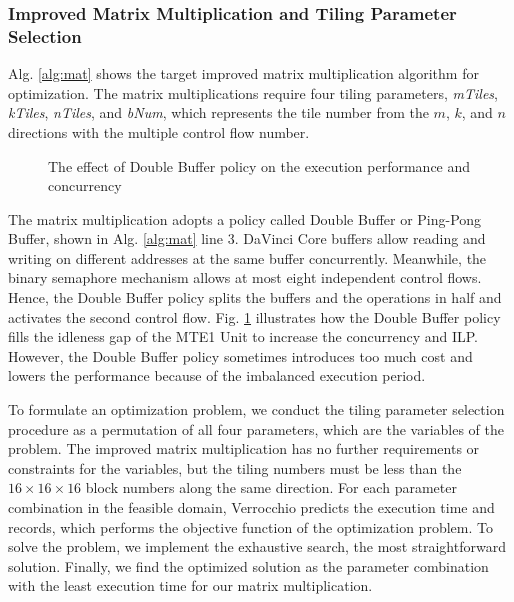 \documentclass[12pt]{extbook}
\begin{document}
\subsubsection{Improved Matrix Multiplication and Tiling Parameter Selection}

Alg. \ref{alg:mat} shows the target improved matrix multiplication algorithm for optimization. The matrix multiplications require four tiling parameters, \textit{mTiles}, \textit{kTiles}, \textit{nTiles}, and \textit{bNum}, which represents the tile number from the $m$, $k$, and $n$ directions with the multiple control flow number. 

\begin{figure}[tbp]
    \captionsetup{justification=centering}
    \caption{The effect of Double Buffer policy on the execution performance and concurrency}
    \label{fig:doubleb}
    \end{figure}

The matrix multiplication adopts a policy called Double Buffer or Ping-Pong Buffer, shown in Alg. \ref{alg:mat} line 3. DaVinci Core buffers allow reading and writing on different addresses at the same buffer concurrently. Meanwhile, the binary semaphore mechanism allows at most eight independent control flows. Hence, the Double Buffer policy splits the buffers and the operations in half and activates the second control flow. Fig. \ref{fig:doubleb} illustrates how the Double Buffer policy fills the idleness gap of the MTE1 Unit to increase the concurrency and ILP. However, the Double Buffer policy sometimes introduces too much cost and lowers the performance because of the imbalanced execution period.

To formulate an optimization problem, we conduct the tiling parameter selection procedure as a permutation of all four parameters, which are the variables of the problem. The improved matrix multiplication has no further requirements or constraints for the variables, but the tiling numbers must be less than the $16 \times 16 \times 16$ block numbers along the same direction. For each parameter combination in the feasible domain, Verrocchio predicts the execution time and records, which performs the objective function of the optimization problem. To solve the problem, we implement the exhaustive search, the most straightforward solution. Finally, we find the optimized solution as the parameter combination with the least execution time for our matrix multiplication.
\end{document}
